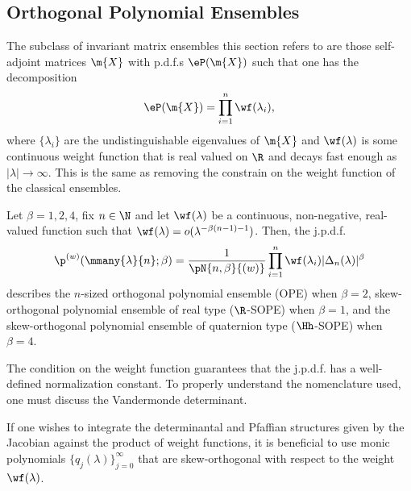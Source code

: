 \subsection{Orthogonal Polynomial Ensembles}

The subclass of invariant matrix ensembles this section refers to are those self-adjoint matrices $\m{X}$ with p.d.f.s $\eP(\m{X})$ such that one has the decomposition
\begin{equation}
	\eP(\m{X}) = \prod_{i=1}^n \wf(\lambda_i),
\end{equation}
where $\{\lambda_i\}$ are the undistinguishable eigenvalues of $\m{X}$ and $\wf(\lambda)$ is some continuous weight function that is real valued on $\R$ and decays fast enough as $|\lambda| \rightarrow \infty$. This is the same as removing the constrain on the weight function of the classical ensembles.

\begin{definition}
	Let $\beta = 1, 2, 4$, fix $n \in \N$ and let $\wf(\lambda)$ be a continuous, non-negative, real-valued function such that $\wf(\lambda) = o(\lambda^{-\beta(n-1)-1})$. Then, the j.p.d.f.
	\begin{equation}
		\p^{(w)}(\mmany{\lambda}{n};\beta) = \frac{1}{\pN{n,\beta}{(w)}} \prod_{i=1}^{n} \wf(\lambda_i) |\Delta_n(\lambda)|^\beta
	\end{equation}
	describes the $n$-sized orthogonal polynomial ensemble (OPE) when $\beta = 2$, skew-orthogonal polynomial ensemble of real type ($\R$-SOPE) when $\beta=1$, and the skew-orthogonal polynomial ensemble of quaternion type ($\Hh$-SOPE) when $\beta = 4$.
	\label{Definition: measure-weight}
\end{definition}
The condition on the weight function guarantees that the j.p.d.f. has a well-defined normalization constant. To properly understand the nomenclature used, one must discuss the Vandermonde determinant.

If one wishes to integrate the determinantal and Pfaffian structures given by the Jacobian against the product of weight functions, it is beneficial to use monic polynomials $\{q_j(\lambda)\}_{j=0}^\infty$ that are skew-orthogonal with respect to the weight $\wf(\lambda)$.

